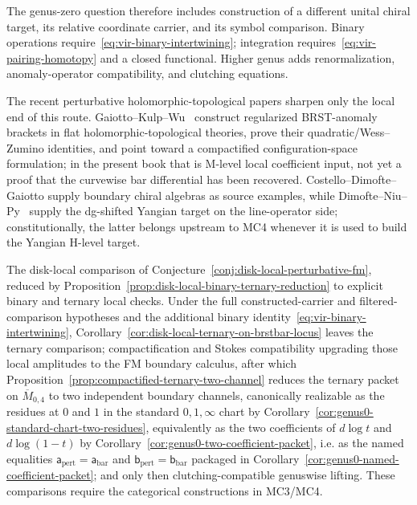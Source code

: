 \begin{remark}
The genus-zero question therefore includes construction of a different unital chiral target, its relative coordinate carrier, and its symbol comparison.
Binary operations require~\eqref{eq:vir-binary-intertwining}; integration requires~\eqref{eq:vir-pairing-homotopy} and a closed functional.
Higher genus adds renormalization, anomaly-operator compatibility, and clutching equations.

The recent perturbative holomorphic-topological papers sharpen only the
local end of this route.  Gaiotto--Kulp--Wu~\cite{GKW24} construct
regularized BRST-anomaly brackets in flat holomorphic-topological
theories, prove their quadratic/Wess--Zumino identities, and point
toward a compactified configuration-space formulation; in the present
book that is M-level local coefficient input, not yet a proof that the
curvewise bar differential has been recovered.  Costello--Dimofte--Gaiotto
\cite{CDG20} supply boundary chiral algebras as source examples, while
Dimofte--Niu--Py~\cite{DNP25} supply the dg-shifted Yangian target on
the line-operator side; constitutionally, the latter belongs upstream to
MC4 whenever it is used to build the Yangian H-level target.

The disk-local comparison of
Conjecture~\ref{conj:disk-local-perturbative-fm}, reduced by
Proposition~\ref{prop:disk-local-binary-ternary-reduction} to explicit
binary and ternary local checks. Under the full constructed-carrier and filtered-comparison hypotheses and the additional binary identity~\eqref{eq:vir-binary-intertwining}, Corollary~\ref{cor:disk-local-ternary-on-brstbar-locus} leaves the ternary comparison; compactification and
Stokes compatibility upgrading those local amplitudes to the FM
boundary calculus, after which
Proposition~\ref{prop:compactified-ternary-two-channel} reduces the
ternary packet on $\overline{M}_{0,4}$ to two independent boundary
channels, canonically realizable as the residues at $0$ and $1$ in the
standard $0,1,\infty$ chart by
Corollary~\ref{cor:genus0-standard-chart-two-residues}, equivalently as
the two coefficients of
$d\log t$ and $d\log(1-t)$ by
Corollary~\ref{cor:genus0-two-coefficient-packet}, i.e. as the named
equalities
\(\mathsf{a}_{\mathrm{pert}}=\mathsf{a}_{\mathrm{bar}}\) and
\(\mathsf{b}_{\mathrm{pert}}=\mathsf{b}_{\mathrm{bar}}\) packaged in
Corollary~\ref{cor:genus0-named-coefficient-packet};
and only then clutching-compatible genuswise lifting.
These comparisons require the categorical constructions in MC3/MC4.
\end{remark}

